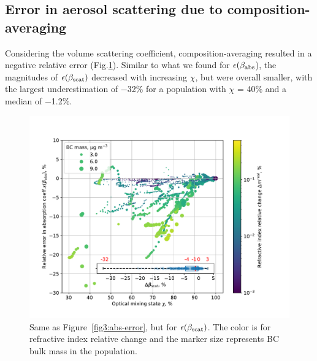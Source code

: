 \documentclass[edeposit,fullpage]{uiucthesis2009}
\begin{document}
\subsection{Error in aerosol scattering due to composition-averaging}
Considering the volume scattering coefficient, composition-averaging
resulted in a negative relative error
(Fig.\ref{fig6:scat-err}). Similar to what we found for
$\epsilon(\beta_{\rm abs}$), the magnitudes of $\epsilon(\beta_{\rm
  scat})$ decreased with increasing $\chi$, but were overall smaller,
with the largest underestimation of $-$32\% for a population with
$\chi$ = 40\% and a median of $-$1.2\%. 

\begin{figure}
	\centering
	\includegraphics[scale=0.50]{chap4_figs/fig6.pdf}
	\caption{Same as Figure~\ref{fig3:abs-error}, but for
          $\epsilon({\beta_{\rm scat}})$. The color is for
          refractive index relative change and the marker size represents BC bulk
          mass in the population.}
	\label{fig6:scat-err}
\end{figure}
\end{document}
